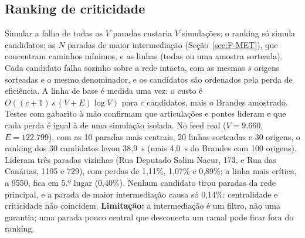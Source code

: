 \subsection{Ranking de criticidade}\label{sec:F-RES-2}

Simular a falha de todas as $V$ paradas custaria $V$ simulações; o ranking só simula
candidatos: as $N$ paradas de maior intermediação (Seção~\ref{sec:F-MET}), que concentram
caminhos mínimos, e as linhas (todas ou uma amostra sorteada). Cada candidato falha sozinho
sobre a rede intacta, com as mesmas $s$ origens sorteadas e o mesmo denominador, e os
candidatos são ordenados pela perda de eficiência. A linha de base é medida uma vez: o
custo é $O((c + 1)\,s\,(V + E)\log V)$ para $c$ candidatos, mais o Brandes amostrado.
Testes com gabarito à mão confirmam que articulações e pontes lideram e que cada perda é
igual à de uma simulação isolada. No feed real ($V = 9{.}660$, $E = 122{.}799$), com as
10 paradas mais centrais, 20 linhas sorteadas e 30 origens, o ranking dos 30 candidatos
levou 38,9~s (mais 4,0~s do Brandes com 100 origens). Lideram três paradas vizinhas (Rua
Deputado Salim Nacur, 173, e Rua das Canárias, 1105 e 729), com perdas de 1,11\%, 1,07\% e
0,89\%; a linha mais crítica, a 9550, fica em 5.º lugar (0,40\%). Nenhum candidato tirou
paradas da rede principal, e a parada de maior intermediação causa só 0,14\%: centralidade
e criticidade não coincidem. \textbf{Limitação:} a intermediação é um filtro, não
uma garantia; uma parada pouco central que desconecta um ramal pode ficar fora do ranking.
